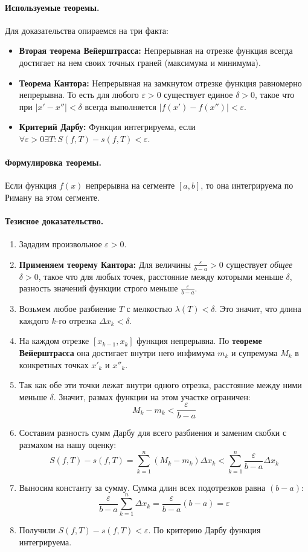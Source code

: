 \paragraph{Используемые теоремы.}
Для доказательства опираемся на три факта:
\begin{itemize}
    \item \textbf{Вторая теорема Вейерштрасса:} Непрерывная на отрезке функция всегда достигает на нем своих точных граней (максимума и минимума).
    \item \textbf{Теорема Кантора:} Непрерывная на замкнутом отрезке функция равномерно непрерывна. То есть для любого $\varepsilon > 0$ существует единое $\delta > 0$, такое что при $|x' - x''| < \delta$ всегда выполняется $|f(x') - f(x'')| < \varepsilon$.
    \item \textbf{Критерий Дарбу:} Функция интегрируема, если $\forall \varepsilon > 0 \exists T: S(f, T) - s(f, T) < \varepsilon$.
\end{itemize}

\paragraph{Формулировка теоремы.}
Если функция $f(x)$ непрерывна на сегменте $[a, b]$, то она интегрируема по Риману на этом сегменте.

\paragraph{Тезисное доказательство.}
\begin{enumerate}
    \item Зададим произвольное $\varepsilon > 0$. 
    \item \textbf{Применяем теорему Кантора:} Для величины $\frac{\varepsilon}{b-a} > 0$ существует \textit{общее} $\delta > 0$, такое что для любых точек, расстояние между которыми меньше $\delta$, разность значений функции строго меньше $\frac{\varepsilon}{b-a}$.
    \item Возьмем любое разбиение $T$ с мелкостью $\lambda(T) < \delta$. Это значит, что длина каждого $k$-го отрезка $\Delta x_k < \delta$.
    \item На каждом отрезке $[x_{k-1}, x_k]$ функция непрерывна. По \textbf{теореме Вейерштрасса} она достигает внутри него инфимума $m_k$ и супремума $M_k$ в конкретных точках $x'_k$ и $x''_k$.
    \item Так как обе эти точки лежат внутри одного отрезка, расстояние между ними меньше $\delta$. Значит, размах функции на этом участке ограничен:
    $$ M_k - m_k < \frac{\varepsilon}{b-a} $$
    \item Составим разность сумм Дарбу для всего разбиения и заменим скобки с размахом на нашу оценку:
    $$ S(f, T) - s(f, T) = \sum_{k=1}^n (M_k - m_k)\Delta x_k < \sum_{k=1}^n \frac{\varepsilon}{b-a}\Delta x_k $$
    \item Выносим константу за сумму. Сумма длин всех подотрезков равна $(b-a)$:
    $$ \frac{\varepsilon}{b-a} \sum_{k=1}^n \Delta x_k = \frac{\varepsilon}{b-a}(b-a) = \varepsilon $$
    \item Получили $S(f, T) - s(f, T) < \varepsilon$. По критерию Дарбу функция интегрируема.
\end{enumerate}

